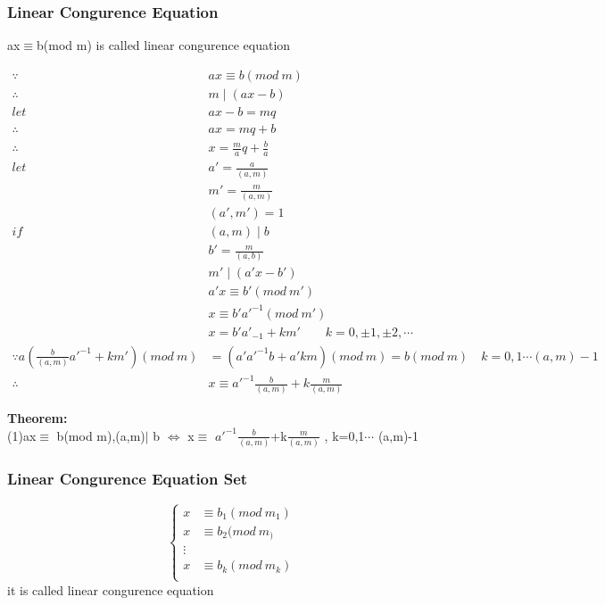 \documentclass{ctexart}
\begin{document}
\subsubsection{Linear Congurence Equation}
ax\(\equiv\)b(mod m) is called linear congurence equation

\vspace{12 pt}
\begin{align*}
\because &ax\equiv b(mod\ m)\\
\therefore &m\mid (ax-b)\\
let\quad &ax-b=mq\\
\therefore &ax=mq+b\\
\therefore &x=\frac{m}{a}q+\frac{b}{a}\\
let\quad &a'=\frac{a}{(a,m)}\\
&m'=\frac{m}{(a,m)}\\
&(a',m')=1\\
if\quad &(a,m)\mid b\\
&b'=\frac{m}{(a,b)}\\
&m'\mid (a'x-b')\\
&a'x\equiv b'(mod\ m')\\
&x\equiv b'a'^{-1}(mod\ m')\\
&x=b'a'_{-1}+km'\qquad k=0,\pm 1,\pm 2,\cdots\\
\because a(\frac{b}{(a,m)}a'^{-1}+km')(mod\ m)&=(a'a'^{-1}b+a'km)(mod\ m)=b(mod\ m)\quad k=0,1\cdots (a,m)-1\\
\therefore &x\equiv a'^{-1}\frac{b}{(a,m)}+k\frac{m}{(a,m)}
\end{align*}

\vspace{12 pt}
\textbf{Theorem:}
\\(1)ax\(\equiv\) b(mod m),(a,m)\(\mid\) b \(\Leftrightarrow\) x\(\equiv\) \(a'^{-1}\)\(\frac{b}{(a,m)}\)+k\(\frac{m}{(a,m)}\) ,  k=0,1\(\cdots\) (a,m)-1

\vspace{12 pt}
\subsubsection{Linear Congurence Equation Set}

\begin{equation*}
\left\{
\begin{array}{lr}
x&\equiv b_1(mod\ m_1) \\
x&\equiv b_2(mod\ m_)\\
\vdots&\\
x&\equiv b_k(mod\ m_k)\\
\end{array}
\right.
\end{equation*}
it is called linear congurence equation 
\end{document}
